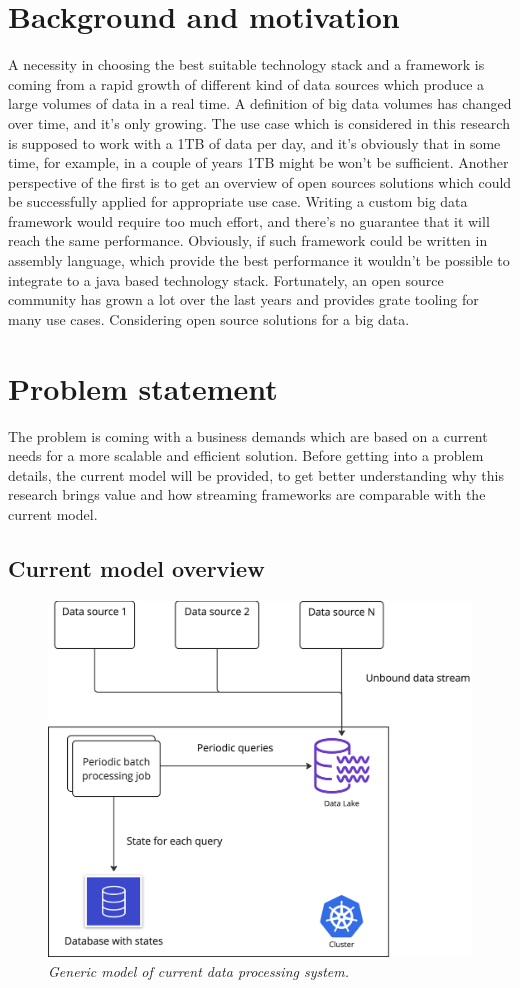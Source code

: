 \section{Background and motivation}\label{sec:back-and-motiv}
A necessity in choosing the best suitable technology stack and a framework is
coming from a rapid growth of different kind of data sources which produce
a large volumes of data in a real time.
A definition of big data volumes has changed over time, and it's only growing.
The use case which is considered in this research is supposed to work with a
1TB of data per day, and it's obviously that in some time, for example, in
a couple of years 1TB might be won't be sufficient.
Another perspective of the first is to get an overview of open sources solutions
which could be successfully applied for appropriate use case.
Writing a custom big data framework would require too much effort,
and there's no guarantee that it will reach the same performance.
Obviously, if such framework could be written in assembly language,
which provide the best performance it wouldn't be possible to integrate
to a java based technology stack.
Fortunately, an open source community has grown a lot over the last years
and provides grate tooling for many use cases.
Considering open source solutions for a big data.

\newpage
\section{Problem statement}\label{sec:prob-st}
The problem is coming with a business demands which are based on a current needs
for a more scalable and efficient solution.
Before getting into a problem details, the current model will be provided, to
get better understanding why this research brings value and how streaming frameworks
are comparable with the current model.

\subsection{Current model overview}\label{subsec:current-model}

\begin{figure}[ht]
    \centering
    \includegraphics[width=.5\textwidth]{figures/current-model}
    \caption{\textit{Generic model of current data processing system.}}
    \label{fig:current-model}
\end{figure}

